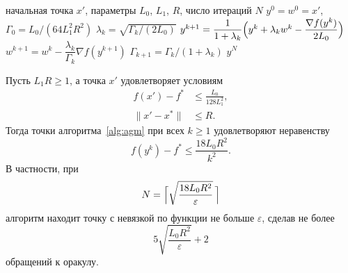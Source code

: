\documentclass[11pt,a4paper]{article}
\newcommand{\norm}[1]{\|#1\|}
\begin{document}
\begin{algorithm}[ht]
\caption{CRUISE (второй этап): ускоренный метод с постоянным шагом из работы \citet{tyurin2026accelerated}}\label{alg:agm}
\begin{algorithmic}[1]
\Require начальная точка $x'$, параметры $L_0$, $L_1$, $R$, число итераций $N$
\State $y^0=w^0=x'$, $\Gamma_0=L_0/(64L_1^2R^2)$
 \State $\lambda_k=\sqrt{\Gamma_k/(2L_0)}$
 \State $y^{k+1}=\dfrac1{1+\lambda_k}\Bigl(y^k+\lambda_kw^k-\dfrac{\nabla f(y^k)}{2L_0}\Bigr)$
 \State $w^{k+1}=w^k-\dfrac{\lambda_k}{\Gamma_k}\nabla f(y^{k+1})$
 \State $\Gamma_{k+1}=\Gamma_k/(1+\lambda_k)$
\EndFor
\State \Return $y^N$
\end{algorithmic}
\end{algorithm}

\begin{proposition}\label{prop:agm}
Пусть $L_1R\ge1$, а точка $x'$ удовлетворяет условиям
\begin{align*}
 f(x')-f^\ast&\le\frac{L_0}{128L_1^2},\\
 \norm{x'-x^\ast}&\le R .
\end{align*}
Тогда точки алгоритма~\ref{alg:agm} при всех $k\ge1$ удовлетворяют неравенству
\[
 f(y^k)-f^\ast\le\frac{18L_0R^2}{k^2} .
\]
В частности, при
\begin{equation}\label{eq:agm-N}
 N=\Bigl\lceil\sqrt{\frac{18L_0R^2}\varepsilon}\,\Bigr\rceil
\end{equation}
алгоритм находит точку с невязкой по функции не больше $\varepsilon$, сделав не более
\[
 5\sqrt{\frac{L_0R^2}\varepsilon}+2
\]
обращений к оракулу.
\end{proposition}
\end{document}
